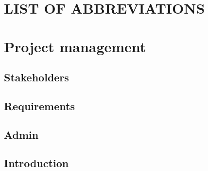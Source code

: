 \documentclass{report}
\title{}
\author{}
\date{}
\begin{document}
\pagestyle{plain}

\adjustmtc
{}
 
\tableofcontents

\listoftables

\listoffigures

\chapter*{LIST OF ABBREVIATIONS}
\pagestyle{super}
 
 \chapter{Project management}
 
 \newpage
 
 
 \newpage
 \section{Stakeholders}
 
 \section{Requirements}
 
 
  \section{Admin}
 


\section{Introduction}



\printbibliography
\end{document}
